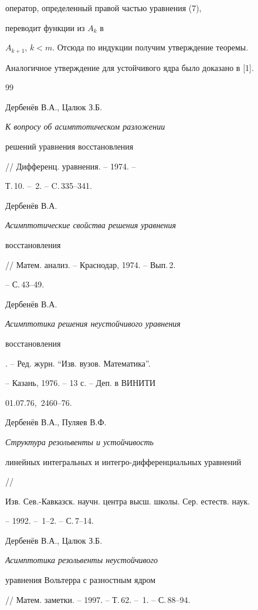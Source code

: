 оператор, определенный правой частью уравнения (7),


переводит функции из $A_k$ в


$A_{k+1}$, $k<m$. Отсюда по индукции получим утверждение теоремы.





Аналогичное утверждение для устойчивого ядра было доказано в [1].





\begin{thebibliography}{99}







Дербен\"ев В.А., Цалюк З.Б. {\em К вопросу об асимптотическом разложении


решений уравнения восстановления} // Дифференц. уравнения. -- 1974. --


Т.\,10. -- \No\,2. -- C.\,335--341. 




Дербен\"ев В.А. {\em Асимптотические свойства решения уравнения


восстановления} // Матем. анализ. -- Краснодар, 1974. -- Вып.\,2.


-- С.\,43--49. 




Дербен\"ев В.А. {\em Асимптотика решения неустойчивого уравнения 


восстановления}. -- Ред. журн. ``Изв. вузов. Математика''.


-- Казань, 1976. -- 13 с. -- Деп. в ВИНИТИ


01.07.76, \No\,2460--76. 




Дербен\"ев В.А., Пуляев В.Ф. {\em Структура резольвенты и устойчивость


линейных интегральных и интегро-дифференциальных уравнений} //


Изв. Сев.-Кавказск. научн. центра высш. школы. Сер. естеств. наук.


-- 1992. -- \No\,1--2. -- С.\,7--14. 




Дербен\"ев В.А., Цалюк З.Б. {\em Асимптотика резольвенты неустойчивого 


уравнения Вольтерра с разностным ядром}


// Матем. заметки. -- 1997. -- Т.\,62. -- \No\,1. -- С.\,88--94. 



\end{thebibliography}

